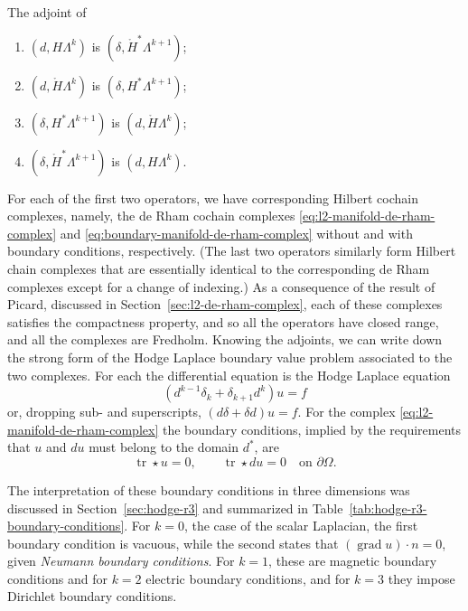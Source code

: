 \begin{Theorem}\label{thm:exterior-codifferential-adjoints}
{The adjoint of}
\begin{enumerate}
\item{$(d,H\Lambda^k)$ is $(\delta,\mathring H^*\Lambda^{k+1})$;}
\item{$(d,\mathring H\Lambda^k)$ is $(\delta,H^*\Lambda^{k+1})$;}
\item{$(\delta,H^*\Lambda^{k+1})$ is $(d,\mathring H\Lambda^k)$;}
\item{$(\delta,\mathring H^*\Lambda^{k+1})$ is $(d,H\Lambda^k)$.}
\end{enumerate}
\end{Theorem}

{For each of the first two operators, we have corresponding Hilbert cochain complexes, namely, the de Rham cochain complexes \eqref{eq:l2-manifold-de-rham-complex} and \eqref{eq:boundary-manifold-de-rham-complex} without and with boundary conditions, respectively. (The last two operators similarly form Hilbert chain complexes that are essentially identical to the corresponding de Rham complexes except for a change of indexing.) As a consequence of the result of Picard, discussed in Section~\ref{sec:l2-de-rham-complex}, each of these complexes satisfies the compactness property, and so all the operators have closed range, and all the complexes are Fredholm. Knowing the adjoints, we can write down the strong form of the Hodge Laplace boundary value problem associated to the two complexes. For each the differential equation is the Hodge Laplace equation}
\[
(d^{k-1}\delta_k+\delta_{k+1}d^k)u=f
\]
{or, dropping sub- and superscripts, $(d\delta+\delta d)u=f$. For the complex \eqref{eq:l2-manifold-de-rham-complex} the boundary conditions, implied by the requirements that $u$ and $du$ must belong to the domain $d^*$, are}
\[
\operatorname{tr}\star u=0,\qquad\operatorname{tr}\star du=0\quad\text{on }\partial\Omega.
\]

{The interpretation of these boundary conditions in three dimensions was discussed in Section~\ref{sec:hodge-r3} and summarized in Table~\ref{tab:hodge-r3-boundary-conditions}. For $k=0$, the case of the scalar Laplacian, the first boundary condition is vacuous, while the second states that $(\operatorname{grad}u)\cdot n=0$, given \emph{Neumann boundary conditions}. For $k=1$, these are magnetic boundary conditions and for $k=2$ electric boundary conditions, and for $k=3$ they impose Dirichlet boundary conditions.}

